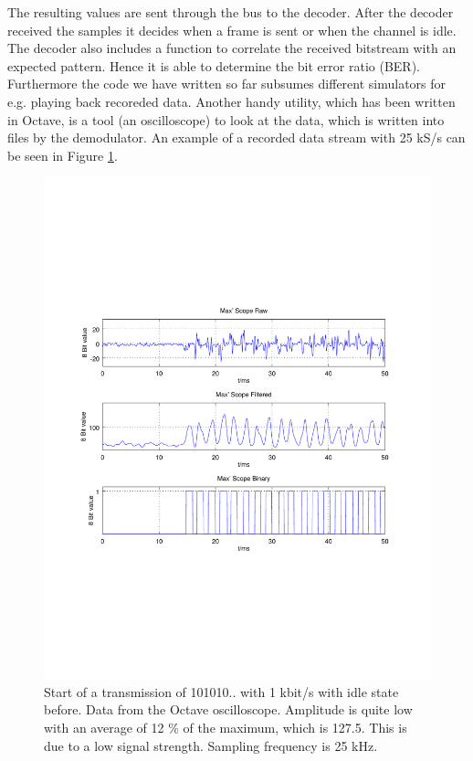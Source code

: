 \documentclass[conference]{IEEEtran}
\begin{document}
The resulting values are sent through the bus to the decoder. After the decoder
received the samples it decides when a frame is sent or when the channel is
idle. The decoder also includes a function to correlate the received bitstream
with an expected pattern. Hence it is able to determine the bit error ratio
(BER). Furthermore the code we have written so far subsumes different
simulators for e.g. playing back recoreded data. Another handy utility, which
has been written in Octave, is a tool (an oscilloscope) to look at the data,
which is written into files by the demodulator. An example of a recorded data
stream with 25 kS/s can be seen in Figure \ref{fig:transmission}.  
\begin{figure}[h]
\centering
\includegraphics[width=\columnwidth]{./fig/transmission}
\caption{Start of a transmission of 101010.. with 1 kbit/s with idle state before. Data from the Octave oscilloscope. Amplitude is quite low with an average of 12 \% of the maximum, which is 127.5. This is due to a low signal strength. Sampling frequency is 25 kHz.}
\label{fig:transmission}
\end{figure}
\end{document}
